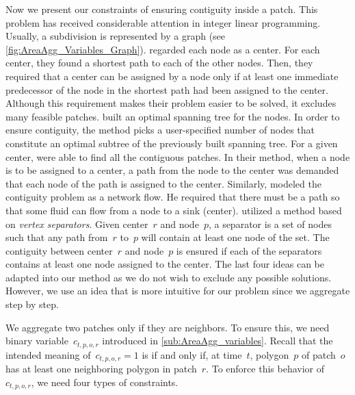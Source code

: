 \documentclass[acmsmall,natbib=false]{acmart}
\begin{document}
Now we present our constraints of 
ensuring contiguity inside a patch.
This problem has received considerable attention 
in integer linear programming.
Usually, a subdivision is represented by a graph
(see \fig\ref{fig:AreaAgg_Variables_Graph}).
%
\textcite{Zoltners1983Territory} regarded each node as a center.
For each center, they found a shortest path 
to each of the other nodes.
Then, they required that a center can be assigned 
by a node only if 
at least one immediate predecessor of the node 
in the shortest path had been assigned to the center.
Although this requirement makes 
their problem easier to be solved,
it excludes many feasible patches.
%
\textcite{Williams2002Contiguous} 
built an optimal spanning tree for the nodes.
In order to ensure contiguity, 
the method picks a user-specified number of nodes that constitute 
an optimal subtree of the previously built spanning tree.
%
For a given center, \textcite{Cova2000_Contiguity} 
were able to find all the contiguous patches.
In their method, when a node is to be assigned to a center, 
a path from the node to the center was demanded 
that each node of the path is assigned to the center.
%
Similarly, \textcite{Shirabe2005Contiguity} modeled 
the contiguity problem as a network flow.
He required that there must be a path so that 
some fluid can flow from a node to a sink (center).
%
\textcite{Oehrlein2017Aggregation} utilized a method based 
on \emph{vertex separators}.	
Given center~$r$ and node~$p$, 
a separator is a set of nodes
such that any path from~$r$ to~$p$ 
will contain at least one node of the set.
The contiguity between center~$r$ and node~$p$ is ensured 
if each of the separators contains 
at least one node assigned to the center.
%
The last four ideas can be adapted into our method
as we do not wish to exclude any possible solutions.
However, we use an idea
that is more intuitive for our problem
since we aggregate step by step.




We aggregate two patches only if they are neighbors.
To ensure this, we need binary variable~$c_{t,p,o,r}$
introduced in \sect\ref{sub:AreaAgg_variables}.
Recall that the intended meaning of~$c_{t,p,o,r}=1$ 
is if and only if, at time~$t$, 
polygon~$p$ of patch~$o$ has 
at least one neighboring polygon in patch~$r$.
To enforce this behavior of~$c_{t,p,o,r}$, 
we need four types of constraints.
\end{document}
